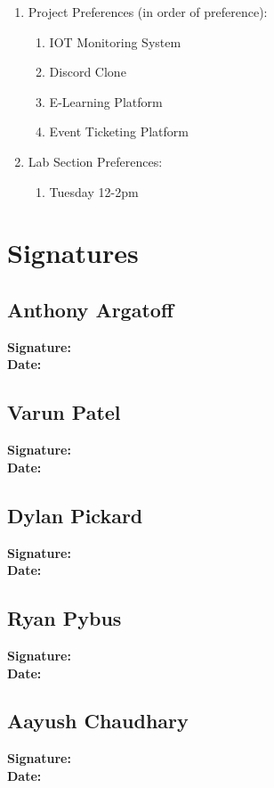 \documentclass{article}
\begin{document}
\begin{enumerate}
    \item Project Preferences (in order of preference):
        \begin{enumerate}
            \item IOT Monitoring System
            \item Discord Clone
            \item E-Learning Platform
            \item Event Ticketing Platform
        \end{enumerate}
    \item Lab Section Preferences:
        \begin{enumerate}
            \item Tuesday 12-2pm
        \end{enumerate}
\end{enumerate}

\pagebreak

\section*{Signatures}

\subsection*{Anthony Argatoff}
\textbf{Signature:} \\[10pt]
\textbf{Date:}

\subsection*{Varun Patel}
\textbf{Signature:} \\[10pt]
\textbf{Date:}

\subsection*{Dylan Pickard}
\textbf{Signature:} \\[10pt]
\textbf{Date:}

\subsection*{Ryan Pybus}
\textbf{Signature:} \\[10pt]
\textbf{Date:}

\subsection*{Aayush Chaudhary}
\textbf{Signature:} \\[10pt]
\textbf{Date:}
\end{document}
